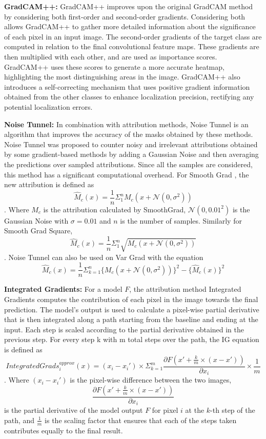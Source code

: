 \documentclass[a4paper,11pt,openright]{book}
\begin{document}
\textbf{GradCAM++: } GradCAM++ \cite{chattopadhayGradCAMGeneralizedGradientBased2018} improves upon the original GradCAM method by considering both first-order and second-order gradients. Considering both allows GradCAM++ to gather more detailed information about the significance of each pixel in an input image. The second-order gradients of the target class are computed in relation to the final convolutional feature maps. These gradients are then multiplied with each other, and are used as importance scores. GradCAM++ uses these scores to generate a more accurate heatmap, highlighting the most distinguishing areas in the image. GradCAM++ also introduces a self-correcting mechanism that uses positive gradient information obtained from the other classes to enhance localization precision, rectifying any potential localization errors.

\textbf{Noise Tunnel: }
In combination with attribution methods, Noise Tunnel \cite{kokhlikyanCaptumUnifiedGeneric2020} is an algorithm that improves the accuracy of the masks obtained by these methods. Noise Tunnel was proposed to counter noisy and irrelevant attributions obtained by some gradient-based methods by adding a Gaussian Noise and then averaging the predictions over sampled attributions. Since all the samples are considered, this method has a significant computational overhead. For Smooth Grad \cite{smilkovSmoothGradRemovingNoise2017}, the new attribution is defined as $$\hat M_{c}(x) = \frac{1}{n}\Sigma_{1}^{n}M_{c}(x + \mathcal{N}(0, \sigma^{2}))$$. Where $M_{c}$ is the attribution calculated by SmoothGrad, $\mathcal {N}(0, 0.01^2)$ is the Gaussian Noise with $\sigma = 0.01$ and $n$ is the number of samples. Similarly for Smooth Grad Square, $$\hat M_{c}(x) = \frac{1}{n}\Sigma_{1}^{n}\sqrt{M_{c}(x + \mathcal{N}(0, \sigma^{2}))}$$. Noise Tunnel can also be used on Var Grad \cite{richterVarGradLowVarianceGradient2020} with the equation $$\hat M_{c}(x) = \frac{1}{n}\Sigma_{k=1}^{n}\{M_{c}(x + \mathcal{N}(0, \sigma^{2}))\}^{2}- \{\hat M_{c}(x)\}^{2}$$

\textbf{Integrated Gradients: }
For a model $F$, the attribution method Integrated Gradients \cite{sundararajanAxiomaticAttributionDeep2017} computes the contribution of each pixel in the image towards the final prediction. The model's output is used to calculate a pixel-wise partial derivative that is then integrated along a path starting from the baseline and ending at the input. Each step is scaled according to the partial derivative obtained in the previous step. For every step k with m total steps over the path, the IG equation is defined as $$IntegratedGrads_i^{approx}(x) =(x_{i}-x_i')\times \Sigma_{k=1}^{m}\frac{\partial F(x' + \frac{k}{m} \times (x-x'))}{\partial x_{i}} \times \frac{1}{m}$$. Where $(x_{i} - x_{i}')$ is the pixel-wise difference between the two images, $$\frac{\partial F(x' + \frac{k}{m} \times (x-x'))}{\partial x_i}$$ is the partial derivative of the model output $F$ for pixel $i$ at the $k$-th step of the path, and $\frac{1}{m}$ is the scaling factor that ensures that each of the steps taken contributes equally to the final result.
\end{document}
